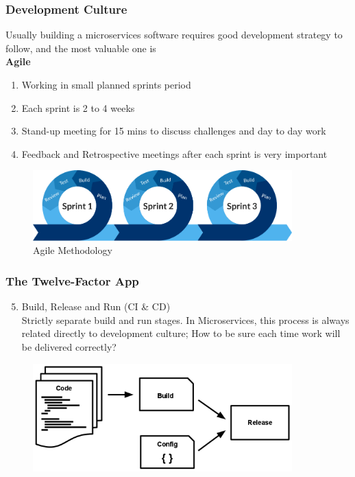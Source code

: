 \documentclass{beamer}
\begin{document}
		\begin{frame}
			\frametitle{Development Culture}
			Usually building a microservices software requires good development strategy to follow, and the most valuable one is \\
			
			\vspace{1mm}
			\hspace{3mm} \textbf {Agile} \\
			
			\begin{enumerate}
				\item<1-> \scriptsize {Working in small planned sprints period}
				\item<2-> \scriptsize {Each sprint is 2 to 4 weeks} 
				\item<3-> \scriptsize {Stand-up meeting for 15 mins to discuss challenges and day to day work}
				\item<4-> \scriptsize {Feedback and Retrospective meetings after each sprint is very important}
			\end{enumerate}
		
			\begin{figure}[h]
				\includegraphics[width=100mm,scale=1]{img/agile.png}
				\caption{Agile Methodology}
			\end{figure}
		\end{frame}
		
		\begin{frame}[label=ci]
			\frametitle{The Twelve-Factor App}
				\begin{enumerate}
					\setcounter{enumi}{4}
					\item Build, Release and Run (CI \& CD) \\
					\small {Strictly separate build and run stages. In Microservices, this process is always related directly to development culture; How to be sure each time work will be delivered correctly?}\\
				\end{enumerate}
			
			\begin{figure}[h]
				\includegraphics[width=100mm,scale=1]{img/release.png}
			\end{figure}
		\end{frame}
		
\end{document}
